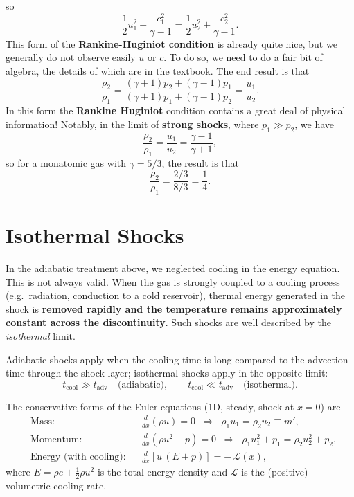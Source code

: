 so
\[
\boxed{
\frac{1}{2}u_1^2 + \frac{c_1^2}{\gamma -1} = \frac{1}{2}u_2^2 + \frac{c_2^2}{\gamma -1}.
}
\]
This form of the \textbf{Rankine-Huginiot condition} is already quite nice, but we generally do not observe easily $u$ or $c$.  To do so, we need to do a fair bit of algebra, the details of which are in the textbook. The end result is that
\begin{equation}
    \label{eq:rankine_huginiot_2}
    \boxed{
    \frac{\rho_2}{\rho_1} = \frac{(\gamma + 1)p_2 + (\gamma - 1)p_1}{(\gamma + 1)p_1 + (\gamma -1) p_2} = \frac{u_1}{u_2}.
    }
\end{equation}
In this form the \textbf{Rankine Huginiot} condition contains a great deal of physical information! Notably, in the limit of \textbf{strong shocks}, where $p_1 \gg p_2$, we have
\[
\frac{\rho_2}{\rho_1} = \frac{u_1}{u_2} = \frac{\gamma -1}{\gamma + 1},
\]
so for a monatomic gas with $\gamma = 5/3$, the result is that
\[
\frac{\rho_2}{\rho_1} = \frac{2/3}{8/3} = \frac{1}{4}.
\]
\section{Isothermal Shocks}

In the adiabatic treatment above, we neglected cooling in the energy equation. This is not always valid. When the gas is strongly coupled to a cooling process (e.g.\ radiation, conduction to a cold reservoir), thermal energy generated in the shock is \textbf{removed rapidly and the temperature remains approximately constant across the discontinuity}. Such shocks are well described by the \emph{isothermal} limit.

\begin{remark}
Adiabatic shocks apply when the cooling time is long compared to the advection time through the shock layer; isothermal shocks apply in the opposite limit:
\[
t_{\mathrm{cool}} \gg t_{\mathrm{adv}} \quad \text{(adiabatic)}, 
\qquad
t_{\mathrm{cool}} \ll t_{\mathrm{adv}} \quad \text{(isothermal)}.
\]
\end{remark}

The conservative forms of the Euler equations (1D, steady, shock at $x=0$) are
\begin{align}
&\text{Mass:} && \frac{d}{dx}(\rho u) = 0
\;\;\Longrightarrow\;\;
\rho_1 u_1 = \rho_2 u_2 \equiv m', \label{eq:iso_mass}\\[4pt]
&\text{Momentum:} && \frac{d}{dx}\!\left(\rho u^2 + p\right) = 0
\;\;\Longrightarrow\;\;
\rho_1 u_1^2 + p_1 = \rho_2 u_2^2 + p_2, \label{eq:iso_mom}\\[4pt]
&\text{Energy (with cooling):} && 
\frac{d}{dx}\!\left[u\,(E+p)\right] = -\,\mathcal{L}(x), \label{eq:energy_cooling}
\end{align}
where $E=\rho e + \tfrac{1}{2}\rho u^2$ is the total energy density and $\mathcal{L}$ is the (positive) volumetric cooling rate.

